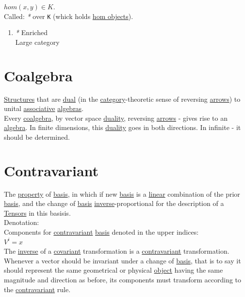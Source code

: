 \documentclass[a4paper,14pt,oneside]{book}
\begin{document}
\(hom(x,y) \in K\).\\

Called: \emph{*} over \texttt{K} (whick holds \hyperref[org6fdb871]{hom objects}).\\

\begin{enumerate}
\item \emph{*}
\label{sec:org2b7b5a2}
\label{orgb38cc46}Enriched\\
\label{org0d1c9b8}Large category\\
\end{enumerate}

\chapter{\label{org9c34c7f}Coalgebra}
\label{sec:org6ce4d95}
\hyperref[org5ea44de]{Structures} that are \hyperref[orgccd1357]{dual} (in the \hyperref[org841d8bc]{category}-theoretic sense of reversing \hyperref[org516b7ab]{arrows}) to unital \hyperref[org1621588]{associative} \hyperref[org44272d3]{algebras}.\\
Every \hyperref[org9c34c7f]{coalgebra}, by vector space \hyperref[orgf3e1944]{duality}, reversing \hyperref[org516b7ab]{arrows} - gives rise to an \hyperref[orgd3760ff]{algebra}. In finite dimensions, this \hyperref[orgf3e1944]{duality} goes in both directions. In infinite - it should be determined.\\

\chapter{\label{org375eb52}Contravariant}
\label{sec:orga86dd2b}
The \hyperref[org91a1c9f]{property} of \hyperref[orge8a5e35]{basis}, in which if new \hyperref[orge8a5e35]{basis} is a \hyperref[orgdbc19f4]{linear} combination of the prior \hyperref[orge8a5e35]{basis}, and the change of \hyperref[orge8a5e35]{basis} \hyperref[org51e2137]{inverse}-proportional for the description of a \hyperref[org746e487]{Tensors} in this basisis.\\

Denotation:\\
Components for \hyperref[org375eb52]{contravariant} \hyperref[orge8a5e35]{basis} denoted in the upper indices:\\
\(V^{i} = x\)\\

The \hyperref[org51e2137]{inverse} of a \hyperref[orgd54bd43]{covariant} transformation is a \hyperref[org375eb52]{contravariant} transformation. Whenever a vector should be invariant under a change of \hyperref[orge8a5e35]{basis}, that is to say it should represent the same geometrical or physical \hyperref[org5771609]{object} having the same magnitude and direction as before, its components must transform according to the \hyperref[org375eb52]{contravariant} rule.\\
\end{document}
